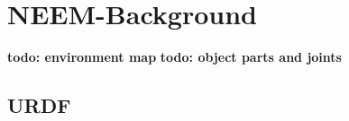 
\section{NEEM-Background}
\label{ch:background}

\textbf{todo: environment map}
\textbf{todo: object parts and joints}

\subsection{URDF}

